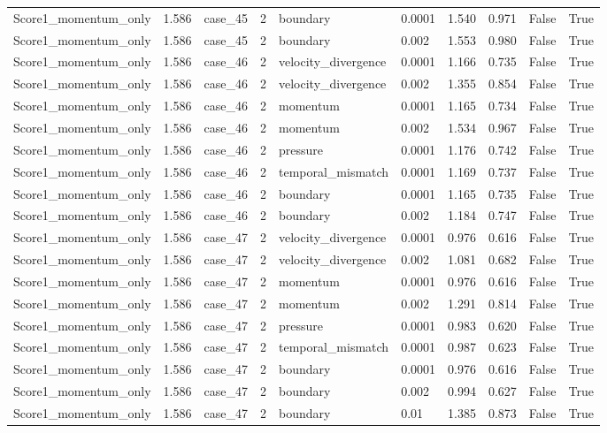 \begin{longtable}{llllllllll}
Score1\_momentum\_only & 1.586 & case\_45 & 2 & boundary & 0.0001 & 1.540 & 0.971 & False & True \\
Score1\_momentum\_only & 1.586 & case\_45 & 2 & boundary & 0.002 & 1.553 & 0.980 & False & True \\
Score1\_momentum\_only & 1.586 & case\_46 & 2 & velocity\_divergence & 0.0001 & 1.166 & 0.735 & False & True \\
Score1\_momentum\_only & 1.586 & case\_46 & 2 & velocity\_divergence & 0.002 & 1.355 & 0.854 & False & True \\
Score1\_momentum\_only & 1.586 & case\_46 & 2 & momentum & 0.0001 & 1.165 & 0.734 & False & True \\
Score1\_momentum\_only & 1.586 & case\_46 & 2 & momentum & 0.002 & 1.534 & 0.967 & False & True \\
Score1\_momentum\_only & 1.586 & case\_46 & 2 & pressure & 0.0001 & 1.176 & 0.742 & False & True \\
Score1\_momentum\_only & 1.586 & case\_46 & 2 & temporal\_mismatch & 0.0001 & 1.169 & 0.737 & False & True \\
Score1\_momentum\_only & 1.586 & case\_46 & 2 & boundary & 0.0001 & 1.165 & 0.735 & False & True \\
Score1\_momentum\_only & 1.586 & case\_46 & 2 & boundary & 0.002 & 1.184 & 0.747 & False & True \\
Score1\_momentum\_only & 1.586 & case\_47 & 2 & velocity\_divergence & 0.0001 & 0.976 & 0.616 & False & True \\
Score1\_momentum\_only & 1.586 & case\_47 & 2 & velocity\_divergence & 0.002 & 1.081 & 0.682 & False & True \\
Score1\_momentum\_only & 1.586 & case\_47 & 2 & momentum & 0.0001 & 0.976 & 0.616 & False & True \\
Score1\_momentum\_only & 1.586 & case\_47 & 2 & momentum & 0.002 & 1.291 & 0.814 & False & True \\
Score1\_momentum\_only & 1.586 & case\_47 & 2 & pressure & 0.0001 & 0.983 & 0.620 & False & True \\
Score1\_momentum\_only & 1.586 & case\_47 & 2 & temporal\_mismatch & 0.0001 & 0.987 & 0.623 & False & True \\
Score1\_momentum\_only & 1.586 & case\_47 & 2 & boundary & 0.0001 & 0.976 & 0.616 & False & True \\
Score1\_momentum\_only & 1.586 & case\_47 & 2 & boundary & 0.002 & 0.994 & 0.627 & False & True \\
Score1\_momentum\_only & 1.586 & case\_47 & 2 & boundary & 0.01 & 1.385 & 0.873 & False & True \\

\end{longtable}
